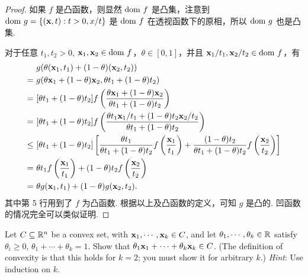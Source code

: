 \documentclass[UTF8]{ctexart}
\begin{document}
\begin{proof}
  如果 $f$ 是凸函数，则显然 $\mathrm {dom~} f$ 是凸集，注意到 $\mathrm {dom~} g=\{(\mathbf x,t):t>0,x/t\}$ 是 $\mathrm {dom~} f$ 在透视函数下的原相，所以 $\mathrm {dom~} g$ 也是凸集.
  
  对于任意 $t_1,t_2>0$, $\mathbf x_1,\mathbf x_2\in\mathrm {dom~} f$，$\theta\in[0,1]$，并且 $\mathbf x_1/t_1, \mathbf x_2/t_2\in \mathrm {dom~} f$，有
  \begin{align*}
    &~g(\theta(\mathbf x_1,t_1)+(1-\theta)(\mathbf x_2,t_2))\\
   =&~g(\theta\mathbf x_1+(1-\theta)\mathbf x_2, \theta t_1+(1-\theta)t_2)\\
   =&~[\theta t_1+(1-\theta)t_2]f\left(\frac{\theta\mathbf x_1+(1-\theta)\mathbf x_2}{\theta t_1+(1-\theta)t_2}\right)\\
   =&~[\theta t_1+(1-\theta)t_2]f\left(\frac{\theta t_1\mathbf x_1/t_1+(1-\theta)t_2\mathbf x_2/t_2}{\theta t_1+(1-\theta)t_2}\right)\\
\leq&~[\theta t_1+(1-\theta)t_2]\left[\frac{\theta t_1}{\theta t_1+(1-\theta)t_2}f\left(\frac{\mathbf x_1}{t_1}\right)
   +\frac{(1-\theta)t_2}{\theta t_1+(1-\theta)t_2}f\left(\frac{\mathbf x_2}{t_2}\right)\right]\\
   =&~\theta t_1f\left(\frac{\mathbf x_1}{t_1}\right)+(1-\theta) t_2f\left(\frac{\mathbf x_2}{t_2}\right)\\
   =&~\theta g(\mathbf x_1,t_1)+(1-\theta)g(\mathbf x_2,t_2).
  \end{align*}
  其中第 5 行用到了 $f$ 为凸函数.
  根据以上及凸函数的定义，可知 $g$ 是凸的. 凹函数的情况完全可以类似证明.
\end{proof}
\begin{problem}[Boyd 2.1]
  Let $C\subseteq\mathbb R^n$ be a convex set, with $\mathbf x_1,\cdots,\mathbf x_k\in C$,
  and let $\theta_1,\cdots,\theta_k\in\mathbb R$ satisfy $\theta_i\geq 0$,
  $\theta_1+\cdots+\theta_k=1$. Show that $\theta_1\mathbf x_1+\cdots+\theta_k\mathbf x_k\in C$.
  (The definition of convexity is that this holds for $k=2$; you must show it for arbitrary $k$.) \emph{Hint}: Use induction on $k$.
\end{problem}
\end{document}
